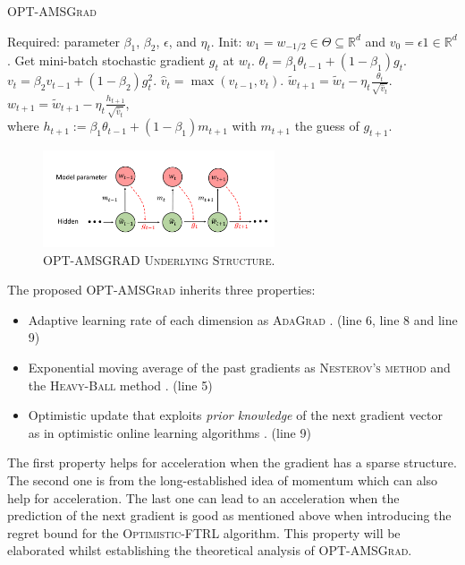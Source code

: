 \documentclass[11pt]{article}
\theoremstyle{k}
\begin{document}
\vspace{-0.15in}
\begin{minipage}{0.54\linewidth}
\begin{algorithm}[H]
\begin{algorithmic}[1] 
\small
\caption{\textsc{OPT-AMSGrad}} \label{alg:optamsgrad}
\STATE Required: parameter $\beta_1$, $\beta_2$, $\epsilon$, and $\eta_t$. 
\STATE Init: $w_1 = w_{-1/2} \in \Theta \subseteq \mathbb R^d $ and $v_{0} = \epsilon 1 \in \mathbb R^{d}$.
\STATE Get mini-batch stochastic gradient $g_t$ at $w_t$.
\STATE $\theta_t = \beta_{1} \theta_{t-1} + (1 - \beta_{1}) g_t$.
\STATE $v_t = \beta_2 v_{t-1} + (1 - \beta_2) g_t^{2}$.
\STATE $\hat{v}_t = \max( \hat{v}_{t-1} , v_t )$. 
\STATE $\tilde{w}_{t+1} =  \tilde{w}_{t} - \eta_t \frac{\theta_t}{ \sqrt{\hat{v}_t }  } $.
\STATE $w_{t+1} = \tilde{w}_{t+1} - \eta_{t} \frac{h_{t+1}}{ \sqrt{\hat{v}_t } } $,  \\  
where $h_{t+1}:= \beta_{1} \theta_{t-1} + (1 - \beta_{1}) m_{t+1}$ with $m_{t+1}$ the guess of $g_{t+1}$. 
\ENDFOR 
\end{algorithmic}
\end{algorithm}
\end{minipage}
\hfill
\begin{minipage}{0.46\linewidth}
\begin{figure}[H]
\captionsetup{justification=centering}
    \hspace{-0.15in}
    \includegraphics[width=2.7in]{plot.pdf}
    \caption{\textsc{OPT-AMSGRAD Underlying Structure}.}
     \label{fig:scheme}
\end{figure}
\end{minipage}

The proposed \textsc{OPT-AMSGrad} inherits three properties:
\begin{itemize}
\item Adaptive learning rate of each dimension as \textsc{AdaGrad} \citep{DHS11}. (line 6, line 8 and line 9)
\item Exponential moving average of the past gradients as \textsc{Nesterov's method} \citep{N04} and the \textsc{Heavy-Ball} method \citep{P64}. (line 5)
\item Optimistic update that exploits \emph{prior knowledge} of the next gradient vector as in optimistic online learning algorithms \citep{CJ12,rakhlin2013online,SALS15}. (line 9)
\end{itemize}
The first property helps for acceleration when the gradient has a sparse structure.
The second one is from the long-established idea of momentum which can also help for acceleration. 
The last one can lead to an acceleration when the prediction of the next gradient is good as mentioned above when introducing the regret bound for the \textsc{Optimistic-FTRL} algorithm.
This property will be elaborated whilst establishing the theoretical analysis of \textsc{OPT-AMSGrad}.
\end{document}
